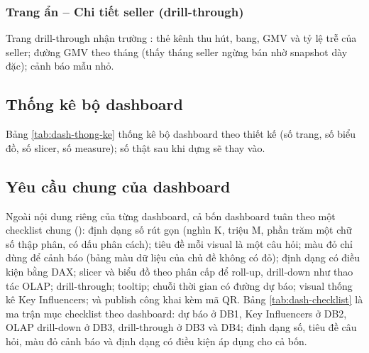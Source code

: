 \subsubsection*{Trang ẩn -- Chi tiết seller (drill-through)}

Trang drill-through nhận trường : thẻ kênh thu hút, bang, GMV và tỷ lệ trễ của seller; đường GMV theo tháng (thấy tháng seller ngừng bán nhờ snapshot dày đặc); cảnh báo mẫu nhỏ.


\subsection{Thống kê bộ dashboard}\label{sec:dash-thong-ke}
Bảng \ref{tab:dash-thong-ke} thống kê bộ dashboard theo thiết kế (số trang, số biểu đồ, số slicer, số measure); số thật sau khi dựng sẽ thay vào.



\subsection{Yêu cầu chung của dashboard}\label{sec:dash-checklist}
Ngoài nội dung riêng của từng dashboard, cả bốn dashboard tuân theo một checklist chung (): định dạng số rút gọn (nghìn K, triệu M, phần trăm một chữ số thập phân, có dấu phân cách); tiêu đề mỗi visual là một câu hỏi; màu đỏ chỉ dùng để cảnh báo (bảng màu dữ liệu của chủ đề không có đỏ); định dạng có điều kiện bằng DAX; slicer và biểu đồ theo phân cấp để roll-up, drill-down như thao tác OLAP; drill-through; tooltip; chuỗi thời gian có đường dự báo; visual thống kê Key Influencers; và publish công khai kèm mã QR. Bảng \ref{tab:dash-checklist} là ma trận mục checklist theo dashboard: dự báo ở DB1, Key Influencers ở DB2, OLAP drill-down ở DB3, drill-through ở DB3 và DB4; định dạng số, tiêu đề câu hỏi, màu đỏ cảnh báo và định dạng có điều kiện áp dụng cho cả bốn.



